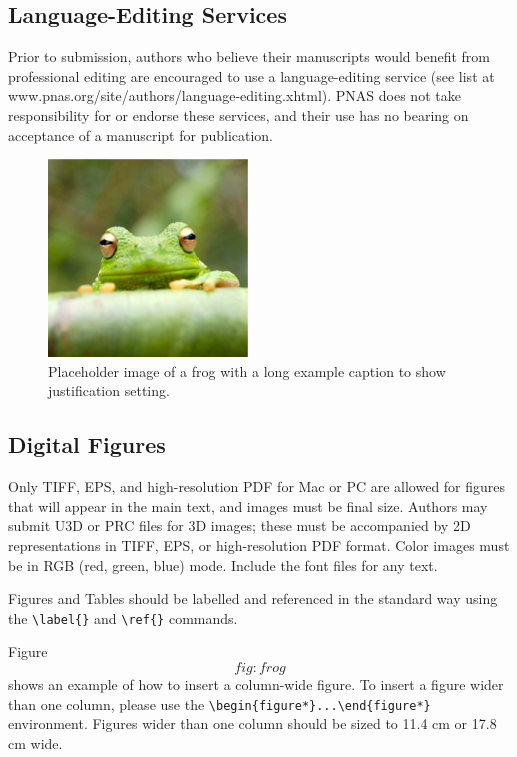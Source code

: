 \documentclass[9pt,twocolumn,twoside,]{pnas-new}
\begin{document}
\subsection*{Language-Editing Services}\label{language-editing-services}

Prior to submission, authors who believe their manuscripts would benefit
from professional editing are encouraged to use a language-editing
service (see list at www.pnas.org/site/authors/language-editing.xhtml).
PNAS does not take responsibility for or endorse these services, and
their use has no bearing on acceptance of a manuscript for publication.

\begin{figure}
\centering
\includegraphics{frog.png}
\caption{Placeholder image of a frog with a long example caption to show
justification setting.{}}
\end{figure}

\subsection*{Digital Figures}\label{sec:figures}

Only TIFF, EPS, and high-resolution PDF for Mac or PC are allowed for
figures that will appear in the main text, and images must be final
size. Authors may submit U3D or PRC files for 3D images; these must be
accompanied by 2D representations in TIFF, EPS, or high-resolution PDF
format. Color images must be in RGB (red, green, blue) mode. Include the
font files for any text.

Figures and Tables should be labelled and referenced in the standard way
using the \texttt{\textbackslash{}label\{\}} and
\texttt{\textbackslash{}ref\{\}} commands.

Figure \[fig:frog\] shows an example of how to insert a column-wide
figure. To insert a figure wider than one column, please use the
\texttt{\textbackslash{}begin\{figure*\}...\textbackslash{}end\{figure*\}}
environment. Figures wider than one column should be sized to 11.4 cm or
17.8 cm wide.
\end{document}
